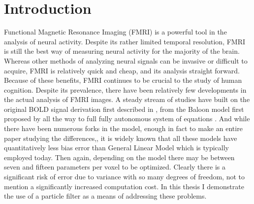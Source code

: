 \documentclass{article}
\begin{document}
\section{Introduction}
Functional Magnetic Resonance Imaging (FMRI) is a powerful tool in the analysis
of neural activity. Despite its rather limited temporal resolution, FMRI is still
the best way of measuring neural activity for the majority of the brain.
Whereas other methods
of analyzing neural signals can be invasive or difficult to acquire, 
FMRI is relatively quick and cheap, and its analysis straight forward.
Because of these benefits, FMRI continues to be crucial to the study of human 
cognition. Despite its prevalence, there have been relatively few developments
in the actual analysis of FMRI images. A steady stream of studies have built
on the original BOLD signal derivation first described in \cite{Ogawa}, 
from the Baloon model first proposed by \cite{Buxton1998}
all the way to full fully autonomous system of equations \cite{Riera2004}. And while
there have been numerous forks in the model, enough in fact to make an entire paper
studying the differences,\cite{Deneux2006}, it is widely known that all these
models have quantitatively less bias error than General Linear Model which is
typically employed today. Then again, depending on the model there may be between
seven \cite{Riera2004} and fifteen \cite{Zheng2002} parameters per voxel to
be optimized. Clearly there is a significant risk of error due to variance
with so many degrees of freedom, not to mention a significantly increased
computation cost. In this thesis I demonstrate the use of a 
particle filter as a means of addressing these problems.
\end{document}
